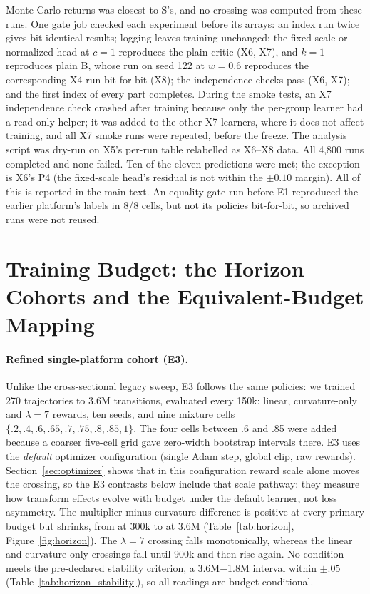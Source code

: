 Monte-Carlo returns was closest to S's, and no crossing was computed from these runs. One gate job checked each
experiment before its arrays: an index run twice gives bit-identical results; logging leaves training unchanged; the
fixed-scale or normalized head at $c=1$ reproduces the plain critic (X6, X7), and $k=1$ reproduces plain B, whose run on
seed 122 at $w=0.6$ reproduces the corresponding X4 run bit-for-bit (X8); the independence checks pass (X6, X7); and
the first index of every part completes. During the smoke tests, an X7 independence check crashed after training
because only the per-group learner had a read-only helper; it was added to the other X7 learners, where it does not
affect training, and all X7 smoke runs were repeated, before the freeze. The analysis script was dry-run on X5's
per-run table relabelled as X6--X8 data. All 4,800 runs completed and none failed. Ten of the eleven predictions were
met; the exception is X6's P4 (the fixed-scale head's residual is not within the $\pm0.10$ margin). All of this is reported in the main text. An equality gate run before E1 reproduced the earlier platform's
labels in 8/8 cells, but not its policies bit-for-bit, so archived runs were not reused.

\section{Training Budget: the Horizon Cohorts and the Equivalent-Budget Mapping}
\label{app:horizon}

\paragraph{Refined single-platform cohort (E3).}
Unlike the cross-sectional legacy sweep, E3 follows the same policies: we trained 270 trajectories to 3.6M transitions, evaluated every 150k: linear,
curvature-only and $\lambda=7$ rewards, ten seeds, and nine mixture cells
$\{.2,.4,.6,.65,.7,.75,.8,.85,1\}$. The four cells between .6 and .85 were added because a coarser
five-cell grid gave zero-width bootstrap intervals there. E3 uses the \emph{default} optimizer
configuration (single Adam step, global clip, raw rewards). Section~\ref{sec:optimizer} shows that in this
configuration reward scale alone moves the crossing, so the E3 contrasts below include that scale pathway:
they measure how transform effects evolve with budget under the default learner, not loss asymmetry. The
multiplier-minus-curvature difference is positive at every primary budget but shrinks, from
\VfourHorizonStart{} at 300k to \VfourHorizonEnd{} at 3.6M (Table~\ref{tab:horizon},
Figure~\ref{fig:horizon}). The $\lambda=7$ crossing falls monotonically,
whereas the linear and curvature-only crossings fall until 900k and then rise again. No condition meets
the pre-declared stability criterion, a 3.6M$-$1.8M interval within $\pm.05$
(Table~\ref{tab:horizon_stability}), so all readings are budget-conditional.

